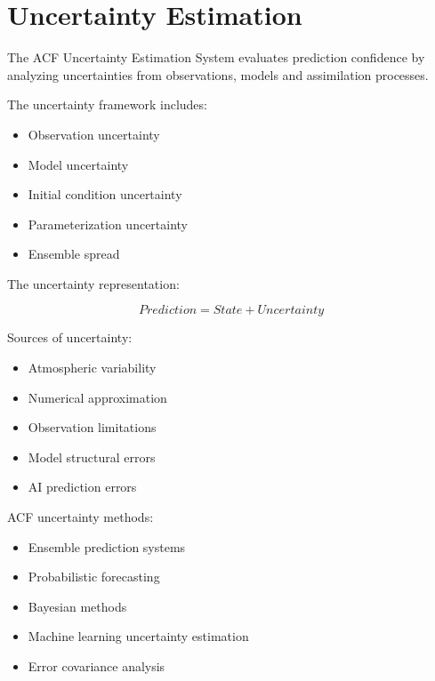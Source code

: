 \section{Uncertainty Estimation}



The ACF Uncertainty Estimation System evaluates prediction
confidence by analyzing uncertainties from observations,
models and assimilation processes.



The uncertainty framework includes:


\begin{itemize}

\item Observation uncertainty

\item Model uncertainty

\item Initial condition uncertainty

\item Parameterization uncertainty

\item Ensemble spread

\end{itemize}



The uncertainty representation:


\[
Prediction =
State
+
Uncertainty
\]



Sources of uncertainty:


\begin{itemize}

\item Atmospheric variability

\item Numerical approximation

\item Observation limitations

\item Model structural errors

\item AI prediction errors

\end{itemize}



ACF uncertainty methods:


\begin{itemize}

\item Ensemble prediction systems

\item Probabilistic forecasting

\item Bayesian methods

\item Machine learning uncertainty estimation

\item Error covariance analysis

\end{itemize}



